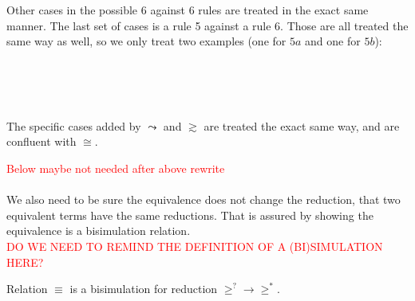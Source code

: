 \begin{myproof}
\\~\\
Other cases in the possible 6 against 6 rules are treated in the exact same manner. The last set of cases is a rule 5 against a rule 6. Those are all treated the same way as well, so we only treat two examples (one for $5a$ and one for $5b$):\\
\\
\\~\\
The specific cases added by $\leadsto$ and $\gtrsim$ are treated the exact same way, and are confluent with $\cong$.
\end{myproof}

\textcolor{red}{Below maybe not needed after above rewrite}\\~\\
We also need to be sure the equivalence does not change the reduction, \ie that two equivalent terms have the same reductions. That is assured by showing the equivalence is a bisimulation relation.\\
\textcolor{red}{DO WE NEED TO REMIND THE DEFINITION OF A (BI)SIMULATION HERE?}\\
\begin{proposition}
Relation $\equiv$ is a bisimulation for reduction $\geq^?\to\geq^*$.
\end{proposition}